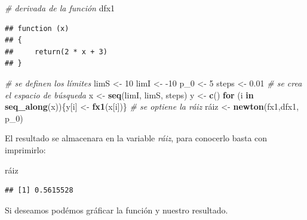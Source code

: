 \documentclass[11pt,]{article}
\newenvironment{Shaded}{\begin{snugshade}}{\end{snugshade}}
\newcommand{\CommentTok}[1]{\textcolor[rgb]{0.56,0.35,0.01}{\textit{#1}}}
\newcommand{\ControlFlowTok}[1]{\textcolor[rgb]{0.13,0.29,0.53}{\textbf{#1}}}
\newcommand{\DecValTok}[1]{\textcolor[rgb]{0.00,0.00,0.81}{#1}}
\newcommand{\FloatTok}[1]{\textcolor[rgb]{0.00,0.00,0.81}{#1}}
\newcommand{\KeywordTok}[1]{\textcolor[rgb]{0.13,0.29,0.53}{\textbf{#1}}}
\newcommand{\NormalTok}[1]{#1}
\newcommand{\StringTok}[1]{\textcolor[rgb]{0.31,0.60,0.02}{#1}}
\begin{document}
\begin{Shaded}
\begin{Highlighting}[]
\CommentTok{# derivada de la función}
\NormalTok{dfx1}
\end{Highlighting}
\end{Shaded}

\begin{verbatim}
## function (x) 
## {
##     return(2 * x + 3)
## }
\end{verbatim}

\begin{Shaded}
\begin{Highlighting}[]
\CommentTok{# se definen los límites}
\NormalTok{limS <-}\StringTok{ }\DecValTok{10}
\NormalTok{limI <-}\StringTok{ }\DecValTok{-10}
\NormalTok{p_}\DecValTok{0}\NormalTok{ <-}\StringTok{ }\DecValTok{5}
\NormalTok{steps <-}\StringTok{ }\FloatTok{0.01}
\CommentTok{# se crea el espacio de búsqueda}
\NormalTok{x <-}\StringTok{ }\KeywordTok{seq}\NormalTok{(limI, limS, steps)}
\NormalTok{y <-}\StringTok{ }\KeywordTok{c}\NormalTok{()}
\ControlFlowTok{for}\NormalTok{ (i }\ControlFlowTok{in} \KeywordTok{seq_along}\NormalTok{(x))\{y[i] <-}\StringTok{ }\KeywordTok{fx1}\NormalTok{(x[i])\}}
\CommentTok{# se optiene la ráiz}
\NormalTok{ráiz <-}\StringTok{ }\KeywordTok{newton}\NormalTok{(fx1,dfx1, p_}\DecValTok{0}\NormalTok{)}
\end{Highlighting}
\end{Shaded}

El resultado se almacenara en la variable \emph{ráiz}, para conocerlo
basta con imprimirlo:

\begin{Shaded}
\begin{Highlighting}[]
\NormalTok{ráiz}
\end{Highlighting}
\end{Shaded}

\begin{verbatim}
## [1] 0.5615528
\end{verbatim}

Si deseamos podémos gráficar la función y nuestro resultado.
\end{document}
